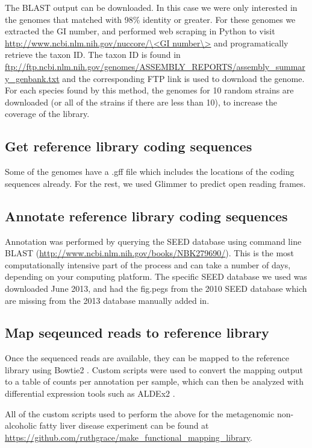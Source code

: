 The BLAST output can be downloaded. In this case we were only interested in the genomes that matched with 98\% identity or greater. For these genomes we extracted the GI number, and performed web scraping in Python to visit \url{http://www.ncbi.nlm.nih.gov/nuccore/\<GI number\>} and programatically retrieve the taxon ID. The taxon ID is found in \url{ftp://ftp.ncbi.nlm.nih.gov/genomes/ASSEMBLY_REPORTS/assembly_summary_genbank.txt} and the corresponding FTP link is used to download the genome. For each species found by this method, the genomes for 10 random strains are downloaded (or all of the strains if there are less than 10), to increase the coverage of the library.

\subsection{Get reference library coding sequences}
Some of the genomes have a .gff file which includes the locations of the coding sequences already. For the rest, we used Glimmer \cite{delcher2007identifying} to predict open reading frames.

\subsection{Annotate reference library coding sequences}
Annotation was performed by querying the SEED database \cite{overbeek2005subsystems} using command line BLAST (\url{http://www.ncbi.nlm.nih.gov/books/NBK279690/}). This is the most computationally intensive part of the process and can take a number of days, depending on your computing platform. The specific SEED database we used was downloaded June 2013, and had the fig.pegs from the 2010 SEED database which are missing from the 2013 database manually added in.

\subsection{Map seqeunced reads to reference library}
Once the sequenced reads are available, they can be mapped to the reference library using Bowtie2 \cite{langmead2012fast}. Custom scripts were used to convert the mapping output to a table of counts per annotation per sample, which can then be analyzed with differential expression tools such as ALDEx2 \cite{fernandes2014unifying}.

All of the custom scripts used to perform the above for the metagenomic non-alcoholic fatty liver disease experiment can be found at \url{https://github.com/ruthgrace/make_functional_mapping_library}.